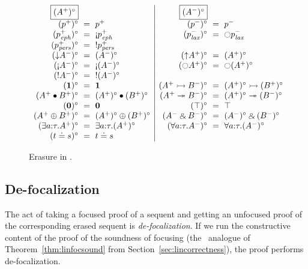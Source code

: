 \begin{figure}
{\small \[
\begin{array}{rcl|rcl}
\fbox{$(A^+)^\circ$} & & &
\fbox{$(A^-)^\circ$} & & 
\\
(p^+)^\circ & \!\!\!=\!\!\! & p^+ &
(p^-)^\circ & \!\!\!=\!\!\! & p^- \\
(p^+_\meph)^\circ & \!\!\!=\!\!\! & {\gnab}p^+_\meph &
(p^-_\mlax)^\circ & \!\!\!=\!\!\! & {\ocircle}p^-_\mlax 
\\
(p^+_\mpers)^\circ & \!\!\!=\!\!\! & {!}p^+_\mpers &
& & 
\\
({\downarrow}A^-)^\circ & \!\!\!=\!\!\! & (A^-)^\circ &
({\uparrow}A^+)^\circ & \!\!\!=\!\!\! & (A^+)^\circ 
\\
({\gnab}A^-)^\circ & \!\!\!=\!\!\! & {\gnab}(A^-)^\circ &
({\ocircle}A^+)^\circ & \!\!\!=\!\!\! & {\ocircle}(A^+)^\circ 
\\
({!}A^-)^\circ & \!\!\!=\!\!\! & {!}(A^-)^\circ &
& & 
\\
(\one)^\circ & \!\!\!=\!\!\! & \one &
(A^+ \lefti B^-)^\circ & \!\!\!=\!\!\! & (A^+)^\circ \lefti (B^+)^\circ 
\\
(A^+ \fuse B^+)^\circ & \!\!\!=\!\!\! & (A^+)^\circ \fuse (B^+)^\circ &
(A^+ \righti B^-)^\circ & \!\!\!=\!\!\! & (A^+)^\circ \righti (B^-)^\circ 
\\
(\zero)^\circ & \!\!\!=\!\!\! & \zero &
(\top)^\circ & \!\!\!=\!\!\! & \top 
\\
(A^+ \oplus B^+)^\circ & \!\!\!=\!\!\! & (A^+)^\circ \oplus (B^+)^\circ &
(A^- \with B^-)^\circ & \!\!\!=\!\!\! & (A^-)^\circ \with (B^-)^\circ 
\\
(\exists a{:}\tau.A^+)^\circ & \!\!\!=\!\!\! & \exists a{:}\tau. (A^+)^\circ &
(\forall a{:}\tau.A^-)^\circ & \!\!\!=\!\!\! & \forall a{:}\tau. (A^-)^\circ 
\\
(t \doteq s)^\circ & \!\!\!=\!\!\! & t \doteq s &
& &
\end{array}
\]}

\caption{Erasure in \ollll.}
\label{fig:ord-erasure}
\end{figure}


\subsection{De-focalization}

The act of taking a focused proof of a sequent and getting an unfocused
proof of the corresponding erased sequent is {\it de-focalization}.
If we run the constructive content of 
the proof of the soundness of focusing (the \ollll~analogue of
Theorem~\ref{thm:linfocsound} from Section~\ref{sec:lincorrectness}),
the proof performs de-focalization.

